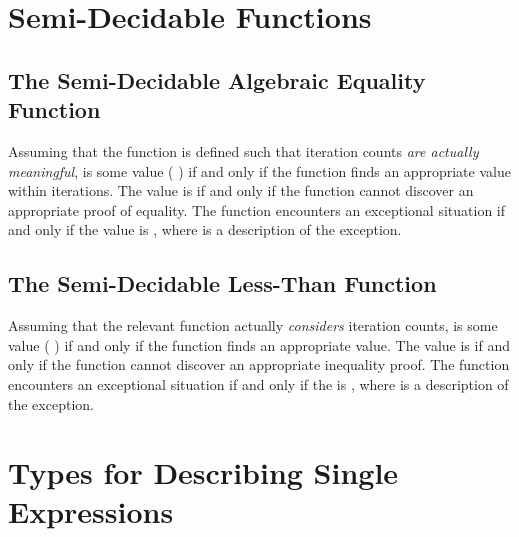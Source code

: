 \documentclass{report}
\begin{document}
\section{Semi-Decidable Functions}

\subsection{The Semi-Decidable Algebraic Equality Function}
Assuming that the function is defined such that iteration counts \emph{are actually meaningful},      is some value  \AgdaSymbol( \AgdaSymbol) if and only if the  function finds an appropriate value within  iterations.  The  value is   if and only if the function cannot discover an appropriate proof of equality.  The function encounters an exceptional situation if and only if the  value is  , where  is a description of the exception.

\subsection{The Semi-Decidable Less-Than Function}
Assuming that the relevant function actually \emph{considers} iteration counts,      is some value  \AgdaSymbol( \AgdaSymbol) if and only if the  function finds an appropriate value.  The  value is   if and only if the function cannot discover an appropriate inequality proof.  The function encounters an exceptional situation if and only if the  is  , where  is a description of the exception.

\section{Types for Describing Single Expressions}
\end{document}
